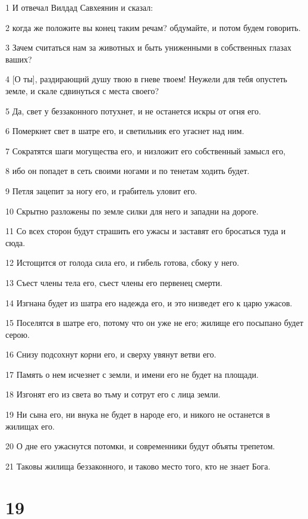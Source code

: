 \par 1 И отвечал Вилдад Савхеянин и сказал:
\par 2 когда же положите вы конец таким речам? обдумайте, и потом будем говорить.
\par 3 Зачем считаться нам за животных и быть униженными в собственных глазах ваших?
\par 4 [О ты], раздирающий душу твою в гневе твоем! Неужели для тебя опустеть земле, и скале сдвинуться с места своего?
\par 5 Да, свет у беззаконного потухнет, и не останется искры от огня его.
\par 6 Померкнет свет в шатре его, и светильник его угаснет над ним.
\par 7 Сократятся шаги могущества его, и низложит его собственный замысл его,
\par 8 ибо он попадет в сеть своими ногами и по тенетам ходить будет.
\par 9 Петля зацепит за ногу его, и грабитель уловит его.
\par 10 Скрытно разложены по земле силки для него и западни на дороге.
\par 11 Со всех сторон будут страшить его ужасы и заставят его бросаться туда и сюда.
\par 12 Истощится от голода сила его, и гибель готова, сбоку у него.
\par 13 Съест члены тела его, съест члены его первенец смерти.
\par 14 Изгнана будет из шатра его надежда его, и это низведет его к царю ужасов.
\par 15 Поселятся в шатре его, потому что он уже не его; жилище его посыпано будет серою.
\par 16 Снизу подсохнут корни его, и сверху увянут ветви его.
\par 17 Память о нем исчезнет с земли, и имени его не будет на площади.
\par 18 Изгонят его из света во тьму и сотрут его с лица земли.
\par 19 Ни сына его, ни внука не будет в народе его, и никого не останется в жилищах его.
\par 20 О дне его ужаснутся потомки, и современники будут объяты трепетом.
\par 21 Таковы жилища беззаконного, и таково место того, кто не знает Бога.

\chapter{19}

